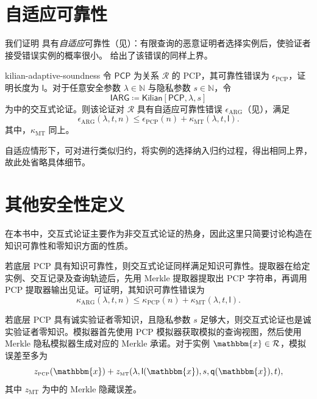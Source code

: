\documentclass[american,singlepageview]{snargs-book-zh}
\newcommand{\DefineEqual}{\coloneqq}
\newcommand{\Naturals}{\mathbb{N}}
\newcommand{\Relation}{\mathcal{R}}
\newcommand{\Instance}{\mathbbm{x}}
\newcommand{\InstanceSize}{n}
\newcommand{\ProtoSoundnessError}{\epsilon}
\newcommand{\ProtoKnowledgeError}{\kappa}
\newcommand{\ProtoZKError}{z}
\newcommand{\ProtoProofLength}{\mathsf{l}}
\newcommand{\ProtoQueryComplexity}{\mathsf{q}}
\newcommand{\PCPSymbol}{\mathsf{PCP}}
\newcommand{\PCPSubscript}{\scriptscriptstyle\mathrm{PCP}}
\newcommand{\PCPSoundnessError}{\ProtoSoundnessError_{\PCPSubscript}}
\newcommand{\PCPKnowledgeError}{\ProtoKnowledgeError_{\PCPSubscript}}
\newcommand{\PCPZKError}{\ProtoZKError_{\PCPSubscript}}
\newcommand{\PCPProofLength}{\ProtoProofLength}
\newcommand{\PCPQueryComplexity}{\ProtoQueryComplexity}
\newcommand{\ARGSubscript}{\scriptscriptstyle\mathrm{ARG}}
\newcommand{\ARGSoundnessError}{\ProtoSoundnessError_{\ARGSubscript}}
\newcommand{\ARGKnowledgeError}{\ProtoKnowledgeError_{\ARGSubscript}}
\newcommand{\IARGSymbol}{\mathsf{IARG}}
\newcommand{\ROQueryBound}{t}
\newcommand{\SecurityParameter}{\lambda}
\newcommand{\PrivacyParameter}{s}
\newcommand{\MTSubscript}{{\scriptscriptstyle\mathrm{MT}}}
\newcommand{\MTZKProofError}{\ProtoZKError_{\MTSubscript}}
\newcommand{\MTExtractionError}{\ProtoKnowledgeError_{\MTSubscript}}
\newcommand{\FormatTransName}[1]{\bm{\mathsf{#1}}}
\newcommand{\KilianSymbol}{\FormatTransName{Kilian}}
\newcommand{\FormatTransInputs}[3]{[#1,#2,#3]}
\newcommand{\KilianTransformation}[3]{\KilianSymbol\FormatTransInputs{#1}{#2}{#3}}
\begin{document}
\section{自适应可靠性}
\label{section:kilian-adaptive-soundness}

我们证明 具有\emph{自适应}可靠性（见）：有限查询的恶意证明者选择实例后，使验证者接受错误实例的概率很小。 给出了该错误的同样上界。

\begin{ImportantTheorem}{}{kilian-adaptive-soundness}
令 $\PCPSymbol$ 为关系 $\Relation$ 的 PCP，其可靠性错误为 $\PCPSoundnessError$，证明长度为 $\PCPProofLength$。对于任意安全参数 $\SecurityParameter\in\Naturals$ 与隐私参数 $\PrivacyParameter\in\Naturals$，令
\[
  \IARGSymbol\DefineEqual\KilianTransformation{\PCPSymbol}{\SecurityParameter}{\PrivacyParameter}
\]
为中的交互式论证。则该论证对 $\Relation$ 具有自适应可靠性错误 $\ARGSoundnessError$（见），满足
\[
  \ARGSoundnessError(\SecurityParameter,\ROQueryBound,\InstanceSize)
  \le
  \PCPSoundnessError(\InstanceSize)
  +
  \MTExtractionError(\SecurityParameter,\ROQueryBound,\PCPProofLength).
\]
其中，$\MTExtractionError$ 同上。
\end{ImportantTheorem}

自适应情形下，可对进行类似归约，将实例的选择纳入归约过程，得出相同上界，故此处省略具体细节。

\section{其他安全性定义}
\label{section:kilian-additional-security-definitions}

在本书中，交互式论证主要作为非交互式论证的热身，因此这里只简要讨论构造在知识可靠性和零知识方面的性质。

若底层 PCP 具有知识可靠性，则交互式论证同样满足知识可靠性。提取器在给定实例、交互记录及查询轨迹后，先用 Merkle 提取器提取出 PCP 字符串，再调用 PCP 提取器输出见证。可证明，其知识可靠性错误为
\[
  \ARGKnowledgeError(\SecurityParameter,\ROQueryBound,\InstanceSize)
  \le
  \PCPKnowledgeError(\InstanceSize)
  +
  \MTExtractionError(\SecurityParameter,\ROQueryBound,\PCPProofLength).
\]

若底层 PCP 具有诚实验证者零知识，且隐私参数 $\PrivacyParameter$ 足够大，则交互式论证也是诚实验证者零知识。模拟器首先使用 PCP 模拟器获取模拟的查询视图，然后使用 Merkle 隐私模拟器生成对应的 Merkle 承诺。对于实例 $\Instance\in\Relation$，模拟误差至多为
\[
  \PCPZKError(\Instance)
  +
  \MTZKProofError(\SecurityParameter,\PCPProofLength(\Instance),\PrivacyParameter,\PCPQueryComplexity(\Instance),\ROQueryBound),
\]
其中 $\MTZKProofError$ 为中的 Merkle 隐藏误差。
\end{document}
